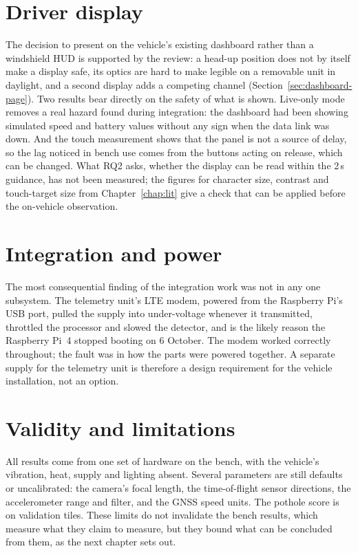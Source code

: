 \section{Driver display}

The decision to present on the vehicle's existing dashboard rather than a windshield HUD is supported by the review: a head-up position does not by itself make a display safe, its optics are hard to make legible on a removable unit in daylight, and a second display adds a competing channel (Section~\ref{sec:dashboard-page}). Two results bear directly on the safety of what is shown. Live-only mode removes a real hazard found during integration: the dashboard had been showing simulated speed and battery values without any sign when the data link was down. And the touch measurement shows that the panel is not a source of delay, so the lag noticed in bench use comes from the buttons acting on release, which can be changed. What RQ2 asks, whether the display can be read within the 2\,s guidance, has not been measured; the figures for character size, contrast and touch-target size from Chapter~\ref{chap:lit} give a check that can be applied before the on-vehicle observation.

\section{Integration and power}

The most consequential finding of the integration work was not in any one subsystem. The telemetry unit's LTE modem, powered from the Raspberry Pi's USB port, pulled the supply into under-voltage whenever it transmitted, throttled the processor and slowed the detector, and is the likely reason the Raspberry Pi~4 stopped booting on 6 October. The modem worked correctly throughout; the fault was in how the parts were powered together. A separate supply for the telemetry unit is therefore a design requirement for the vehicle installation, not an option.

\section{Validity and limitations}

All results come from one set of hardware on the bench, with the vehicle's vibration, heat, supply and lighting absent. Several parameters are still defaults or uncalibrated: the camera's focal length, the time-of-flight sensor directions, the accelerometer range and filter, and the GNSS speed units. The pothole score is on validation tiles. These limits do not invalidate the bench results, which measure what they claim to measure, but they bound what can be concluded from them, as the next chapter sets out.
